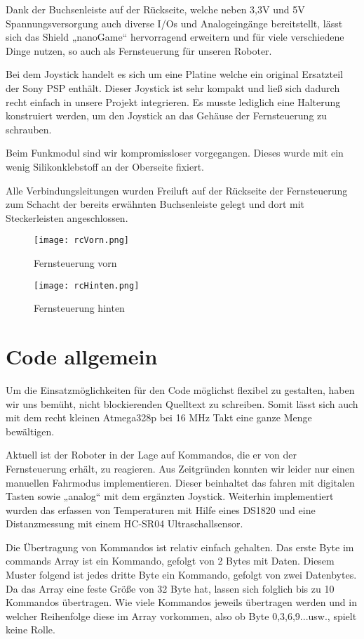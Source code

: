 \documentclass{article}
\begin{document}
Dank der Buchsenleiste auf der Rückseite, welche neben 3,3V und 5V Spannungsversorgung auch diverse I/Os und Analogeingänge bereitstellt, lässt sich das Shield „nanoGame“ hervorragend erweitern und für viele verschiedene Dinge nutzen, so auch als Fernsteuerung für unseren Roboter.

Bei dem Joystick handelt es sich um eine Platine welche ein original Ersatzteil der Sony PSP enthält. Dieser Joystick ist sehr kompakt und ließ sich dadurch recht einfach in unsere Projekt integrieren. Es musste lediglich eine Halterung konstruiert werden, um den Joystick an das Gehäuse der Fernsteuerung zu schrauben.

Beim Funkmodul sind wir kompromissloser vorgegangen. Dieses wurde mit ein wenig Silikonklebstoff an der Oberseite fixiert.

Alle Verbindungsleitungen wurden Freiluft auf der Rückseite der Fernsteuerung zum Schacht der bereits erwähnten Buchsenleiste gelegt und dort mit Steckerleisten angeschlossen.

\begin{figure}[h]
	\texttt{[image: rcVorn.png]}
	\centering
	\caption{Fernsteuerung vorn}
\end{figure}

\begin{figure}[h]
	\texttt{[image: rcHinten.png]}
	\centering
	\caption{Fernsteuerung hinten}
\end{figure}

\newpage
\section{Code allgemein}%

Um die Einsatzmöglichkeiten für den Code möglichst flexibel zu gestalten, haben wir uns bemüht, nicht blockierenden Quelltext zu schreiben.
Somit lässt sich auch mit dem recht kleinen Atmega328p bei 16 MHz Takt eine ganze Menge bewältigen.

Aktuell ist der Roboter in der Lage auf Kommandos, die er von der Fernsteuerung erhält, zu reagieren. Aus Zeitgründen konnten wir leider nur einen manuellen Fahrmodus implementieren. Dieser beinhaltet das fahren mit digitalen Tasten sowie „analog“ mit dem ergänzten Joystick.
Weiterhin implementiert wurden das erfassen von Temperaturen mit Hilfe eines DS1820 und eine Distanzmessung mit einem HC-SR04 Ultraschallsensor.

Die Übertragung von Kommandos ist relativ einfach gehalten. Das erste Byte im commands Array ist ein Kommando, gefolgt von 2 Bytes mit Daten. Diesem Muster folgend ist jedes dritte Byte ein Kommando, gefolgt von zwei Datenbytes.
Da das Array eine feste Größe von 32 Byte hat, lassen sich folglich bis zu 10 Kommandos übertragen. Wie viele Kommandos jeweils übertragen werden und in welcher Reihenfolge diese im Array vorkommen, also ob Byte 0,3,6,9...usw., spielt keine Rolle.
\end{document}
